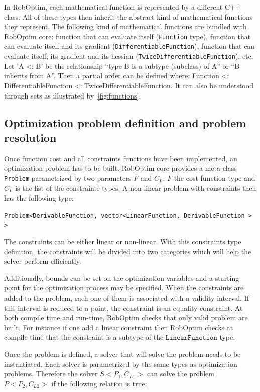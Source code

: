 \documentclass[conference,final,a4paper,twocolumn,9pt]{IEEEtran}
\begin{document}
In RobOptim, each mathematical function is represented by a different
C++ class. All of these types then inherit the abstract kind of
mathematical functions they represent. The following kind of
mathematical functions are bundled with RobOptim core: function that
can evaluate itself (\texttt{Function} type), function that can
evaluate itself and its gradient (\texttt{DifferentiableFunction}),
function that can evaluate itself, its gradient and its hessian
(\texttt{TwiceDifferentiableFunction}), etc.  Let 'A <: B' be the
relationship ``type B is a subtype (subclass) of A'' or ``B inherits
from A''. Then a partial order can be defined where: Function <:
DifferentiableFunction <: TwiceDifferentiableFunction. It can also be
understood through sets as illustrated by~\autoref{fig:functions}.


\subsection{Optimization problem definition and problem resolution}


Once function cost and all constraints functions have been
implemented, an optimization problem has to be built. RobOptim core
provides a meta-class \texttt{Problem} parametrized by two parameters
$F$ and $C_L$. $F$ the cost function type and $C_L$ is the list of the
constraints types. A non-linear problem with constraints then has the
following type:


\texttt{Problem<DerivableFunction, vector<LinearFunction, DerivableFunction > >}


The constraints can be either linear or non-linear. With this
constraints type definition, the constraints will be divided into two
categories which will help the solver perform efficiently.

Additionally, bounds can be set on the optimization variables and a
starting point for the optimization process may be specified. When the
constraints are added to the problem, each one of them is associated
with a validity interval. If this interval is reduced to a point, the
constraint is an equality constraint. At both compile time and
run-time, RobOptim checks that only valid problem are built. For
instance if one add a linear constraint then RobOptim checks at
compile time that the constraint is a subtype of the
$\texttt{LinearFunction}$ type.


Once the problem is defined, a solver that will solve the problem needs
to be instantiated. Each solver is parametrized by the same types as
optimization problems. Therefore the solver $S<P_1,C_{L1}>$ can
solve the problem $P<P_2,C_{L2}>$ if the following relation is true:
\end{document}
